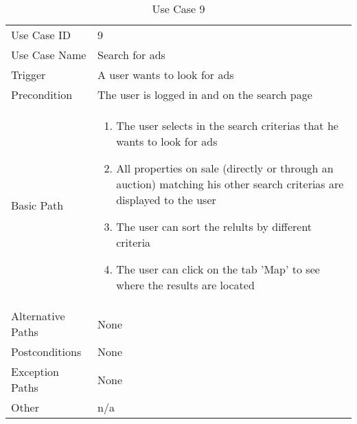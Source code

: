 \begin{table}[H]
\centering
\label{table-use-case-9}
\begin{tabular}{|p{3cm}|p{10cm}}
Use Case ID       & 9                                                         \\
Use Case Name     & Search for ads                                                         \\
Trigger           & A user wants to look for ads                                        \\
Precondition      & The user is logged in and on the search page                             \\
Basic Path        & \begin{enumerate}
\item The user selects in the search criterias that he wants to look for
ads
\item All properties on sale (directly or through an auction) matching his other
search criterias are displayed to the user
\item The user can sort the relults by different criteria
\item The user can click on the tab 'Map' to see where the results are located
\end{enumerate} 
     \\
Alternative Paths & None                          \\
Postconditions    & None                                                      \\
Exception Paths   & None				\\
Other             & n/a                                                                                                                                                                                                        
\end{tabular}
\caption{Use Case 9}
\end{table}



